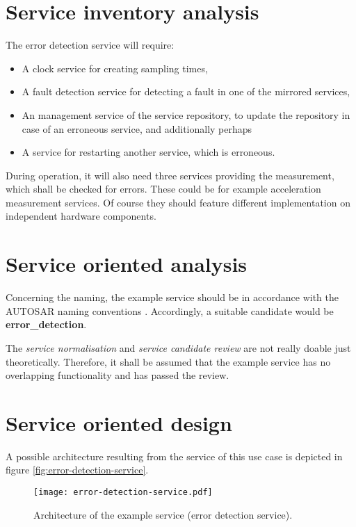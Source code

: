 \section{Service inventory analysis}


The error detection service will require:
\begin{itemize}
\item A clock service for creating sampling times,
\item A fault detection service for detecting a fault in one of the mirrored services,
\item An management service of the service repository, to update the repository in case of an erroneous service, and additionally perhaps
\item A service for restarting another service, which is erroneous.
\end{itemize}

During operation, it will also need three services providing the measurement, which shall be checked for errors. These could be for example acceleration measurement services. Of course they should feature different implementation on independent hardware components.


\section{Service oriented analysis}


Concerning the naming, the example service should be in accordance with the AUTOSAR naming conventions \cite{autosar_system_modelling}. Accordingly, a suitable candidate would be \textbf{error\_detection}.

The \emph{service normalisation} and \emph{service candidate review} are not really doable just theoretically. Therefore, it shall be assumed that the example service has no overlapping functionality and has passed the review.



\section{Service oriented design}



A possible architecture resulting from the service of this use case is depicted in figure \ref{fig:error-detection-service}. 


\begin{figure}[ht]
\centering
\caption{Architecture of the example service (error detection service).}
\label{fig:example-service-architecture}
\texttt{[image: error-detection-service.pdf]}
\end{figure}